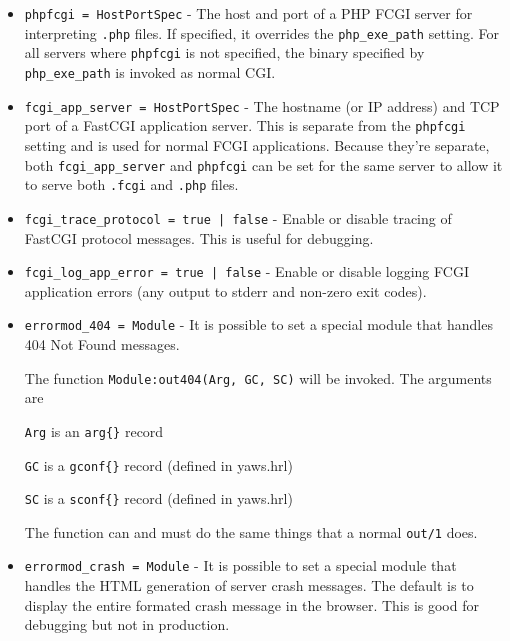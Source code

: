 \documentclass[11pt,oneside,english]{book}
\begin{document}
\begin{itemize}
\item       \verb+phpfcgi = HostPortSpec+ -
              The host and port of a PHP FCGI server for interpreting
              \verb+.php+ files. If specified, it overrides the
              \verb+php_exe_path+ setting. For all servers where
              \verb+phpfcgi+ is not specified, the binary specified by
              \verb+php_exe_path+ is invoked as normal CGI.

\item       \verb+fcgi_app_server = HostPortSpec+ -
              The hostname (or IP address) and TCP port of a
              FastCGI application server. This is separate from the
              \verb+phpfcgi+ setting and is used for normal FCGI
              applications. Because they're separate, both
              \verb+fcgi_app_server+ and \verb+phpfcgi+ can be set for
              the same server to allow it to serve both \verb+.fcgi+
              and \verb+.php+ files.

\item       \verb+fcgi_trace_protocol = true | false+ -
              Enable or disable tracing of FastCGI protocol
              messages. This is useful for debugging.

\item       \verb+fcgi_log_app_error = true | false+ -
              Enable or disable logging FCGI application errors (any
              output to stderr and non-zero exit codes).

\item     \verb+errormod_404 = Module+ -
              It is possible to set a special module  that
              handles 404 Not Found messages.

              The function \verb+Module:out404(Arg, GC, SC)+ will
              be invoked. The arguments are

              \verb+Arg+ is an \verb+arg{}+ record

              \verb+GC+ is a \verb+gconf{}+ record (defined in
              yaws.hrl)

              \verb+SC+ is a \verb+sconf{}+ record (defined in
              yaws.hrl)

              The function can and must do the same things
              that a normal \verb+out/1+ does.

\item       \verb+errormod_crash = Module+ -
              It  is possible to set a special module that
              handles the HTML generation of server  crash
              messages.  The  default  is  to  display the
              entire  formated  crash   message   in   the
              browser.  This is good for debugging but not
              in production.


\end{itemize}
\end{document}
